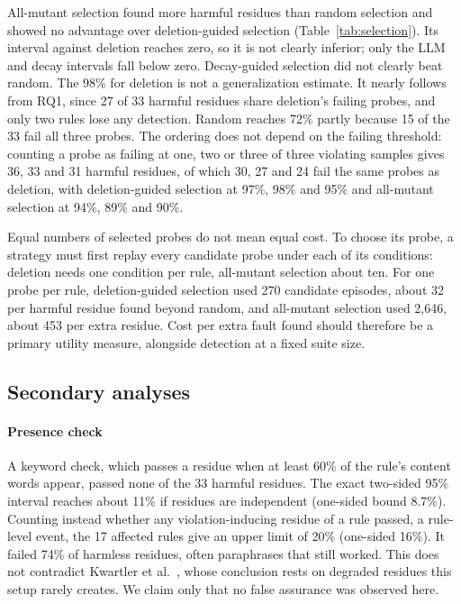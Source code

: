 \documentclass[manuscript,screen,nonacm]{acmart}
\begin{document}
All-mutant selection found more harmful residues than random selection and showed no advantage over deletion-guided selection (Table~\ref{tab:selection}). Its interval against deletion reaches zero, so it is not clearly inferior; only the LLM and decay intervals fall below zero. Decay-guided selection did not clearly beat random. The 98\% for deletion is not a generalization estimate. It nearly follows from RQ1, since 27 of 33 harmful residues share deletion's failing probes, and only two rules lose any detection. Random reaches 72\% partly because 15 of the 33 fail all three probes. The ordering does not depend on the failing threshold: counting a probe as failing at one, two or three of three violating samples gives 36, 33 and 31 harmful residues, of which 30, 27 and 24 fail the same probes as deletion, with deletion-guided selection at 97\%, 98\% and 95\% and all-mutant selection at 94\%, 89\% and 90\%.

Equal numbers of selected probes do not mean equal cost. To choose its probe, a strategy must first replay every candidate probe under each of its conditions: deletion needs one condition per rule, all-mutant selection about ten. For one probe per rule, deletion-guided selection used 270 candidate episodes, about 32 per harmful residue found beyond random, and all-mutant selection used 2,646, about 453 per extra residue. Cost per extra fault found should therefore be a primary utility measure, alongside detection at a fixed suite size.



\subsection{Secondary analyses}

\paragraph{Presence check} A keyword check, which passes a residue when at least 60\% of the rule's content words appear, passed none of the 33 harmful residues. The exact two-sided 95\% interval reaches about 11\% if residues are independent (one-sided bound 8.7\%). Counting instead whether any violation-inducing residue of a rule passed, a rule-level event, the 17 affected rules give an upper limit of 20\% (one-sided 16\%). It failed 74\% of harmless residues, often paraphrases that still worked. This does not contradict Kwartler et al.~\cite{kwartler2026}, whose conclusion rests on degraded residues this setup rarely creates. We claim only that no false assurance was observed here.
\end{document}
